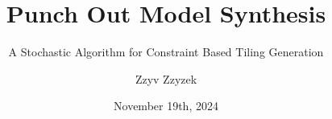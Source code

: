 \documentclass{beamer}
\title{Punch Out Model Synthesis}
\subtitle{A Stochastic Algorithm for Constraint Based Tiling Generation}
\date{November 19th, 2024}
\author{Zzyv Zzyzek}
\begin{document}
\newcommand{\specialcell}[2][c]{\begin{tabular}[#1]{@{}l@{}}#2\end{tabular}}
\newcommand{\specialcellCenter}[2][c]{\begin{tabular}[#1]{@{}c@{}}#2\end{tabular}}

  \maketitle



%
%
%
\end{document}
